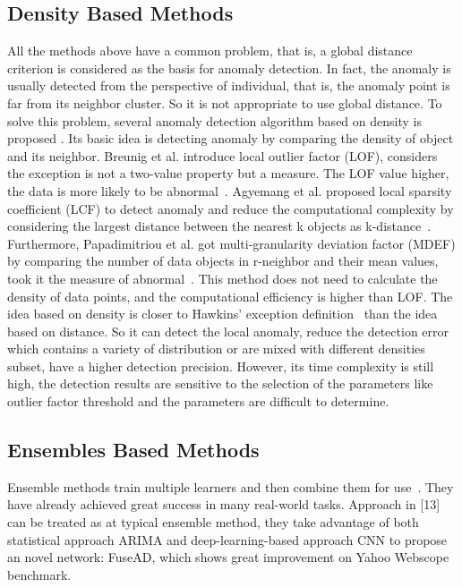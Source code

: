\subsection{Density Based Methods}
All the methods above have a common problem,
that is,
a global distance criterion is considered as
the basis for anomaly detection.
In fact,
the anomaly is usually detected
from the perspective of individual,
that is,
the anomaly point is far from its neighbor cluster.
So it is not appropriate
to use global distance.
To solve this problem,
several anomaly detection
algorithm based
on density is proposed .
Its basic idea is detecting anomaly by comparing
the density of object and its neighbor.
Breunig et al. introduce local
outlier factor (LOF),
considers the exception is not a
two-value property but a measure.
The LOF value higher,
the data is more likely to be abnormal~\cite{breunig2000lof}.
Agyemang et al.
proposed local sparsity coefficient (LCF) to
detect anomaly and reduce
the computational complexity by considering
the largest distance between the nearest k objects as
k-distance~\cite{agyemang2004algorithm}.
Furthermore,
Papadimitriou et al. got multi-granularity
deviation factor (MDEF) by
comparing the number of data objects in r-neighbor and
their mean values,
took it the measure of abnormal~\cite{papadimitriou2003loci}.
This method does not need to calculate the density of data
points,
and the computational efficiency is higher than LOF.
The idea based on density is closer to Hawkins’ exception
definition~\cite{hawkins1980identification}
than the idea based on distance.
So it can detect the local anomaly,
reduce the detection error which contains
a variety of distribution or are mixed with different
densities subset,
have a higher detection precision.
However,
its time complexity is still high,
the detection
results are sensitive to the selection of the parameters like
outlier factor threshold and the parameters are difficult to
determine.
\subsection{Ensembles Based Methods}

Ensemble methods train multiple learners and
then combine them for use~\cite{zhou2012ensemble}.
They have already achieved great success in many
real-world tasks.
Approach in [13] can be treated as at typical ensemble method, 
they take advantage of both statistical approach ARIMA and
deep-learning-based approach CNN to 
propose an novel network: 
FuseAD, 
which shows great improvement on Yahoo Webscope benchmark.


